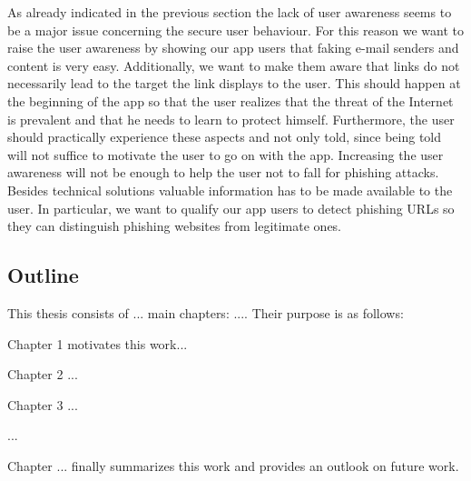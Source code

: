 As already indicated in the previous section the lack of user awareness seems to be a major issue concerning the secure user behaviour. For this reason we want to raise the user awareness by showing our app users that faking e-mail senders and content is very easy. Additionally, we want to make them aware that links do not necessarily lead to the target the link displays to the user. This should happen at the beginning of the app so that the user realizes that the threat of the Internet is prevalent and that he needs to learn to protect himself. Furthermore, the user should practically experience these aspects and not only told, since being told will not suffice to motivate the user to go on with the app.
Increasing the user awareness will not be enough to help the user not to fall for phishing attacks. Besides technical solutions valuable information has to be made available to the user. In particular, we want to qualify our app users to detect phishing URLs so they can distinguish phishing websites from legitimate ones. 







\subsection{Outline}

This thesis consists of ... main chapters: .... Their purpose is as follows:

Chapter 1 motivates this work...

Chapter 2 ...

Chapter 3 ...

...

Chapter ... finally summarizes this work and provides an outlook on future work.





